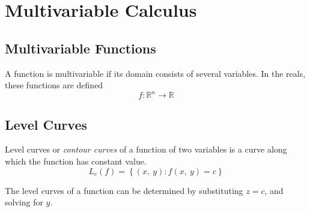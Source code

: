 \documentclass{article}
\begin{document}
\section{Multivariable Calculus}
\subsection{Multivariable Functions}
\begin{definition}
    A function is multivariable if its domain consists of several variables. In
    the reals, these functions are defined
    \begin{equation*}
        f:\mathbb{R}^n\to\mathbb{R}
    \end{equation*}
\end{definition}
\subsection{Level Curves}
\begin{definition}
    Level curves or \textit{contour curves} of a function of two variables is a
    curve along which the function has constant value.
    \begin{equation*}
        L_c\left( f \right) = \left\{ \left( x,\: y \right) : f\left(x,\: y\right) = c\right\}
    \end{equation*}
\end{definition}
The level curves of a function can be determined by substituting $z=c$, and
solving for $y$.
\end{document}
